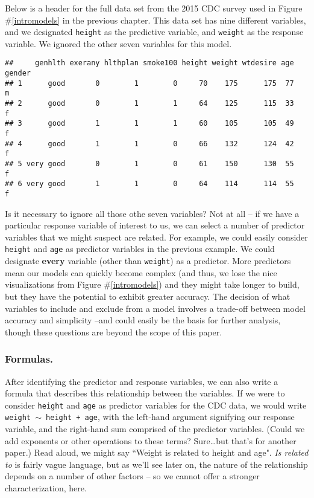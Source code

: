 \documentclass[12pt]{article}\usepackage[]{graphicx}\usepackage[]{color}
\makeatletter
\newenvironment{kframe}{%
 \def\at@end@of@kframe{}%
 \ifinner\ifhmode%
  \def\at@end@of@kframe{\end{minipage}}%
  \begin{minipage}{\columnwidth}%
 \fi\fi%
 \def\FrameCommand##1{\hskip\@totalleftmargin \hskip-\fboxsep
 \colorbox{shadecolor}{##1}\hskip-\fboxsep
     \hskip-\linewidth \hskip-\@totalleftmargin \hskip\columnwidth}%
 \MakeFramed {\advance\hsize-\width
   \@totalleftmargin\z@ \linewidth\hsize
   \@setminipage}}%
 {\par\unskip\endMakeFramed%
 \at@end@of@kframe}
\newenvironment{knitrout}{}{} %
\makeatother
\begin{document}
Below is a header for the full data set from the 2015 CDC survey used in Figure \#\ref{intromodels} in the previous chapter.  This data set has nine different 
variables, and we designated \texttt{height} as the predictive variable, and \texttt{weight} as the response variable.  We ignored the other seven 
variables for this model.

\begin{knitrout}\scriptsize
{}\color{fgcolor}\begin{kframe}
\begin{verbatim}
##     genhlth exerany hlthplan smoke100 height weight wtdesire age gender
## 1      good       0        1        0     70    175      175  77      m
## 2      good       0        1        1     64    125      115  33      f
## 3      good       1        1        1     60    105      105  49      f
## 4      good       1        1        0     66    132      124  42      f
## 5 very good       0        1        0     61    150      130  55      f
## 6 very good       1        1        0     64    114      114  55      f
\end{verbatim}
\end{kframe}
\end{knitrout}

	Is it necessary to ignore all those othe seven variables? Not at all -- if we have a particular response variable of interest to us, we can select a number
of predictor variables that we might suspect are related.  For example, we could easily consider \texttt{height} and \texttt{age} as predictor variables in the previous example.  We could designate \textbf{every} variable (other than \texttt{weight}) as a predictor.  More predictors mean our models can quickly become complex (and thus, we lose the nice visualizations from Figure \#\ref{intromodels}) and they might take longer to build, but they have the potential
to exhibit greater accuracy.  The decision of what variables to include and exclude from a model involves a trade-off between model accuracy and simplicity --and could easily be the basis for further analysis, though these questions are beyond the scope of this paper.

	\subsubsection{Formulas.}
	After identifying the predictor and response variables, we can also write a formula that describes this relationship between the variables.
If we were to consider \texttt{height} and \texttt{age} as predictor variables for the CDC data, we would write \texttt{weight $\sim$ height + age}, with the left-hand argument signifying our response variable, and the right-hand sum comprised of the predictor variables.  (Could we add exponents or other operations to these terms?  Sure\dots but that's for another paper.)  Read aloud, we might say ``Weight is related to height and age". \textit{Is related to} is fairly vague language, but as we'll see later on, the nature of the relationship depends on a number of other factors -- so we cannot offer a stronger characterization, here.
\end{document}
